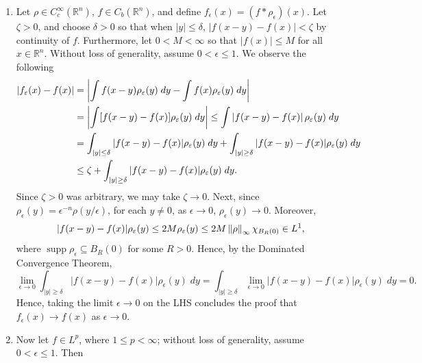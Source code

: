 \documentclass{article}
\begin{document}
\begin{itemize}
	\begin{solutions}
		\begin{enumerate}[itemsep =-2pt,label = (\arabic{*})]
			\item Let $\rho \in C_{c}^{\infty}(\mathbb{R}^{n})$, $f \in C_{b}(\mathbb{R}^{n})$, and define $f_{\epsilon}(x) = (f \ast \rho_{\epsilon})(x)$. Let $\zeta > 0$, and choose $\delta > 0$ so that when $|y| \leq \delta$, $|f(x - y) - f(x)| < \zeta$ by continuity of $f$. Furthermore, let $0 < M < \infty$ so that $|f(x)| \leq M$ for all $x \in \mathbb{R}^{n}$. Without loss of generality, assume $0 < \epsilon \leq 1$. We observe the following 
			\begin{align}
				\begin{split}
					\left| f_{\varepsilon}(x) - f(x) \right| &= \left| \int f(x - y)\rho_{\varepsilon}(y)\;dy - \int f(x) \rho_{\varepsilon}(y)\;dy \right| \\
					&= \left| \int [f(x - y) -f(x)]\rho_{\varepsilon}(y)\;dy \right| \leq \int \left| f(x - y)-f(x) \right|\rho_{\varepsilon}(y)\;dy \\
					&= \int_{|y| \leq \delta}|f(x - y) - f(x)|\rho_{\varepsilon}(y)\;dy + \int_{|y|\geq \delta}|f(x - y) - f(x)|\rho_{\varepsilon}(y)\;dy \\
					&\leq \zeta + \int_{|y|\geq \delta}|f(x - y) - f(x)|\rho_{\varepsilon}(y)\;dy.
				\end{split}
			\end{align}
			Since $\zeta > 0$ was arbitrary, we may take $\zeta \to 0$. Next, since $\rho_{\epsilon}(y) = \epsilon^{-n}\rho(y/\epsilon)$, for each $y \neq 0$, as $\epsilon \to 0$, $\rho_{\epsilon}(y) \to 0$. Moreover, 
			\begin{equation}
				|f(x - y) - f(x)|\rho_{\varepsilon}(y) \leq 2M\rho_{\varepsilon}(y) \leq 2M\left\Vert \rho \right\Vert_{\infty}\chi_{B_{R}(0)}\in L^{1}, 
			\end{equation}
			where $\operatorname{supp}{\rho_{\epsilon}} \subseteq B_{R}(0)$ for some $R > 0$. Hence, by the Dominated Convergence Theorem, 
			\begin{equation}
				\lim_{\epsilon \to 0}\int_{|y|\geq \delta} |f(x - y) - f(x)|\rho_{\epsilon}(y)\;dy = \int_{|y|\geq \delta}\lim_{\epsilon \to 0}|f(x - y) - f(x)|\rho_{\epsilon}(y)\;dy = 0. 
			\end{equation}
			Hence, taking the limit $\epsilon \to 0$ on the LHS concludes the proof that $f_{\epsilon}(x) \to f(x)$ as $\epsilon \to 0$. 
			\item Now let $f \in L^{p}$, where $1 \leq p < \infty$; without loss of generality, assume $0 < \epsilon \leq 1$. Then 
			\begin{align}

\end{align}
\end{enumerate}
\end{solutions}
\end{itemize}
\end{document}

